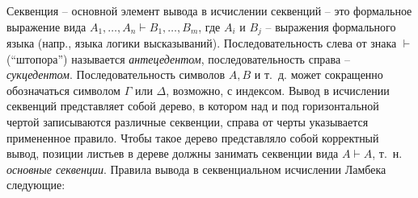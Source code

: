 Секвенция -- основной элемент вывода в исчислении секвенций -- это формальное выражение вида $A_1, \dots, A_n \vdash B_1, \dots, B_m$, где $A_i$ и $B_j$ -- выражения формального языка (напр., языка логики высказываний). Последовательность слева от знака $\vdash$ (``штопора'') называется \textit{антецедентом}, последовательность справа -- \textit{сукцедентом}. Последовательность символов $A, B$ и т.~д. может сокращенно обозначаться символом $\Gamma$ или $\Delta$, возможно, с индексом. Вывод в исчислении секвенций представляет собой дерево, в котором над и под горизонтальной чертой записываются различные секвенции, справа от черты указывается примененное правило. Чтобы такое дерево представляло собой корректный вывод, позиции листьев в дереве должны занимать секвенции вида $A \vdash A$, т.~н. \textit{основные секвенции}. Правила вывода в секвенциальном исчислении Ламбека следующие:

\begin{prooftree}
\end{prooftree}

\begin{prooftree}
\end{prooftree}

\begin{prooftree}
\end{prooftree}

\begin{prooftree}
\end{prooftree}

\begin{prooftree}
\end{prooftree}

\begin{prooftree}
\end{prooftree}

